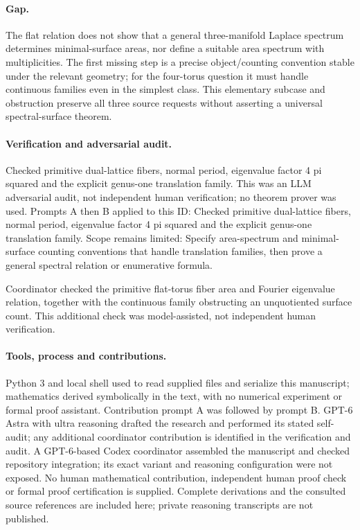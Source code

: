 \documentclass[11pt]{article}
\begin{document}
\paragraph{Gap.}The flat relation does not show that a general three-manifold Laplace spectrum determines minimal-surface areas, nor define a suitable area spectrum with multiplicities. The first missing step is a precise object/counting convention stable under the relevant geometry; for the four-torus question it must handle continuous families even in the simplest class. This elementary subcase and obstruction preserve all three source requests without asserting a universal spectral-surface theorem.

\paragraph{Verification and adversarial audit.}
Checked primitive dual-lattice fibers, normal period, eigenvalue factor 4 pi squared and the explicit genus-one translation family. This was an LLM adversarial audit, not independent human verification; no theorem prover was used. Prompts A then B applied to this ID: Checked primitive dual-lattice fibers, normal period, eigenvalue factor 4 pi squared and the explicit genus-one translation family. Scope remains limited: Specify area-spectrum and minimal-surface counting conventions that handle translation families, then prove a general spectral relation or enumerative formula.

Coordinator checked the primitive flat-torus fiber area and Fourier eigenvalue relation, together with the continuous family obstructing an unquotiented surface count. This additional check was model-assisted, not independent human verification.

\paragraph{Tools, process and contributions.}
Python 3 and local shell used to read supplied files and serialize this manuscript; mathematics derived symbolically in the text, with no numerical experiment or formal proof assistant. Contribution prompt A was followed by prompt B. GPT-6 Astra with ultra reasoning drafted the research and performed its stated self-audit; any additional coordinator contribution is identified in the verification and audit. A GPT-6-based Codex coordinator assembled the manuscript and checked repository integration; its exact variant and reasoning configuration were not exposed. No human mathematical contribution, independent human proof check or formal proof certification is supplied. Complete derivations and the consulted source references are included here; private reasoning transcripts are not published.
\end{document}
